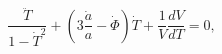 \begin{equation}
\frac{\ddot T}{1-\dot T^2}+\left(3\frac{\dot a}{a}-\dot\Phi\right)\dot T
+\frac{1}{V}\frac{dV}{dT}=0,
\label{tachyon3}
\end{equation}

